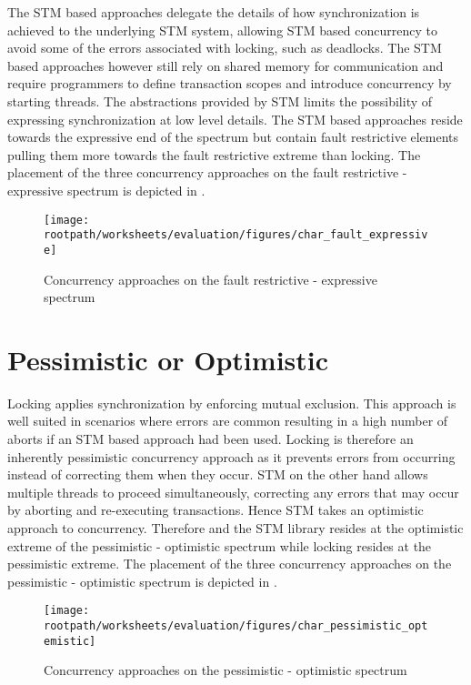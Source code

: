 The \ac{STM} based approaches delegate the details of how synchronization is achieved to the underlying \ac{STM} system, allowing \ac{STM} based concurrency to avoid some of the errors associated with locking, such as deadlocks. The \ac{STM} based approaches however still rely on shared memory for communication and require programmers to define transaction scopes and introduce concurrency by starting threads. The abstractions provided by \ac{STM} limits the possibility of expressing synchronization at low level details. The \ac{STM} based approaches reside towards the expressive end of the spectrum but contain fault restrictive elements pulling them more towards the fault restrictive extreme than locking. The placement of the three concurrency approaches on the fault restrictive - expressive spectrum is depicted in .
\begin{figure}[htbp]
\centering
 \texttt{[image: \\rootpath/worksheets/evaluation/figures/char\_fault\_expressive]} 
 \caption{Concurrency approaches on the fault restrictive - expressive spectrum}
\label{fig:char_fault_expressive}
\end{figure}

\section{Pessimistic or Optimistic}
Locking applies synchronization by enforcing mutual exclusion. This approach is well suited in scenarios where errors are common resulting in a high number of aborts if an \ac{STM} based approach had been used. Locking is therefore an inherently pessimistic concurrency approach as it prevents errors from occurring instead of correcting them when they occur. \ac{STM} on the other hand allows multiple threads to proceed simultaneously, correcting any errors that may occur by aborting and re-executing transactions. Hence \ac{STM} takes an optimistic approach to concurrency.
Therefore \stmnamesp and the \ac{STM} library resides at the optimistic extreme of the pessimistic - optimistic spectrum while locking resides at the pessimistic extreme. The placement of the three concurrency approaches on the pessimistic - optimistic spectrum is depicted in . 
\begin{figure}[htbp]
\centering
 \texttt{[image: \\rootpath/worksheets/evaluation/figures/char\_pessimistic\_optemistic]} 
 \caption{Concurrency approaches on the pessimistic - optimistic spectrum}
\label{fig:char_pes_opti}
\end{figure}

